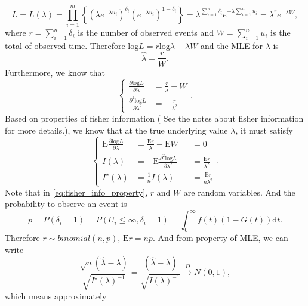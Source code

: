 \documentclass[a4paper,12pt]{article}
\begin{document}
\[
  L = L\left(\lambda\right) =
  \prod\limits_{i = 1}^m\left\{
    \left(
      \lambda e^{-\lambda u_i}
    \right)^{\delta_i}
    \left(
      e^{-\lambda u_i}
    \right)^{1 - \delta_i}
  \right\}
  = \lambda^{\sum\limits_{i = 1}^n \delta_i}
  e^{-\lambda \sum\limits_{i = 1}^n u_i}
  = \lambda^r
  e^{-\lambda W}
  ,
\]
where $r = \sum\limits_{i = 1}^n \delta_i$ is the number of observed events and $W = \sum\limits_{i = 1}^n u_i$ is the total of observed time. Therefore $\mathrm{log}L = r\mathrm{log}\lambda - \lambda W$ and the MLE for $\lambda$ is
\[
  \hat{\lambda} = \frac{r}{W}
  .
\]
Furthermore, we know that
\[
  \left\{
    \begin{aligned}
      \frac{\partial \mathrm{log}L}{\partial \lambda} &= \frac{r}{\lambda} - W    \\
      \frac{\partial^2 \mathrm{log}L}{\partial \lambda^2} &= - \frac{r}{\lambda^2}
    \end{aligned}
  \right.
  .
\]
Based on properties of fisher information ({\color{blue} See the notes about fisher information for more details.}), we know that at the {\color{red}true underlying value} $\lambda$, it must satisfy
\begin{equation}
  \label{eq:fisher_info_property}
  \left\{
    \begin{aligned}
      \mathrm{E}\frac{\partial \mathrm{log}L}{\partial \lambda}
      &= \frac{\mathrm{E}r}{\lambda} - \mathrm{E}W
      &&= 0    \\
      I\left(\lambda\right)
      &= -\mathrm{E}\frac{\partial^2 \mathrm{log}L}{\partial \lambda^2}
      &&= \frac{\mathrm{E}r}{\lambda^2}    \\
      I^\star\left(\lambda\right)
      &= \frac{1}{n}I\left(\lambda\right)
      &&= \frac{\mathrm{E}r}{n\lambda^2}
    \end{aligned}
  \right.
  .    
\end{equation}
Note that in \eqref{eq:fisher_info_property}, $r$ and $W$ are random variables. And the probability to observe an event is
\[
  p = P\left(\delta_i = 1\right)
  = P\left(U_i \leq \infty, \delta_i = 1\right)
  = \int_0^\infty f\left(t\right)\left(1 - G\left(t\right)\right)\mathrm{d}t
  .
\]
Therefore $r\sim binomial\left(n, p\right)$, $\mathrm{E}r = np$. And from property of MLE, we can write
\[
  \frac{\sqrt{n}\left(\hat{\lambda} - \lambda\right)}{\sqrt{I^\star\left(\lambda\right)^{-1}}}
  = \frac{\left(\hat{\lambda} - \lambda\right)}{\sqrt{I\left(\lambda\right)^{-1}}}
  \overset{D}{\rightarrow}
  N\left(0, 1\right)
  ,
\]
which means approximately
\end{document}
